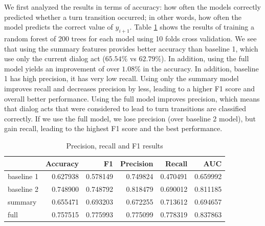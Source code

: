 We first analyzed the results in terms of accuracy: how often the models correctly predicted whether a turn transition occurred; in other words, how often the model predicts the correct value of $y_{i+1}$.
%
Table \ref{table:result} shows the results of training a random forest of 200 trees for each model using 10 folds cross validation. We see that using the summary features provides better accuracy than baseline 1, which use only the current dialog act ($65.54\%$ vs $62.79\%$). In addition, using the full model yields an improvement of over $1.08\%$ in the accuracy. In addition, baseline 1 has high precision, it has very low recall. Using only the summary model improves recall and decreases precision by less, leading to a higher F1 score and overall better performance. Using the full model improves precision, which means that dialog acts that were considered to lead to turn transitions are classified correctly. If we use the full model, we lose precision (over baseline 2 model), but gain recall,
leading to the highest F1 score and the best performance.
%
\begin{table}[ht!]
\begin{center}
\begin{tabular}{lrrrrr}
\toprule
{} &  Accuracy &        F1 &  Precision &    Recall &   AUC \\
\midrule
baseline 1 &  0.627938 &  0.578149 &   0.749824 &  0.470491 &  0.659992 \\
baseline 2 &  0.748900 &  0.748792 &   0.818479 &  0.690012 &  0.811185 \\
summary    &  0.655471 &  0.693203 &   0.672255 &  0.713612 &  0.694657 \\
full       &  0.757515 &  0.775993 &   0.775099 &  0.778319 &  0.837863 \\
\bottomrule
\end{tabular}
\end{center}
\caption{Precision, recall and F1 results }
\label{table:result}
\end{table}



